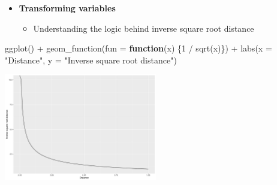 \documentclass[
  ignorenonframetext,
]{beamer}
\newenvironment{Shaded}{\begin{snugshade}}{\end{snugshade}}
\newcommand{\AttributeTok}[1]{\textcolor[rgb]{0.40,0.45,0.13}{#1}}
\newcommand{\ControlFlowTok}[1]{\textcolor[rgb]{0.00,0.23,0.31}{\textbf{#1}}}
\newcommand{\DecValTok}[1]{\textcolor[rgb]{0.68,0.00,0.00}{#1}}
\newcommand{\FunctionTok}[1]{\textcolor[rgb]{0.28,0.35,0.67}{#1}}
\newcommand{\NormalTok}[1]{\textcolor[rgb]{0.00,0.23,0.31}{#1}}
\newcommand{\SpecialCharTok}[1]{\textcolor[rgb]{0.37,0.37,0.37}{#1}}
\newcommand{\StringTok}[1]{\textcolor[rgb]{0.13,0.47,0.30}{#1}}
\providecommand{\tightlist}{%
  \setlength{\itemsep}{0pt}\setlength{\parskip}{0pt}}\usepackage{longtable,booktabs,array}
\begin{document}
\begin{frame}[fragile]{}
\label{section-23}
\begin{itemize}
\item
  \textbf{Transforming variables}

  \begin{itemize}
  \tightlist
  \item
    Understanding the logic behind inverse square root distance
  \end{itemize}
\end{itemize}

\tiny

\begin{Shaded}
\begin{Highlighting}[]
\FunctionTok{ggplot}\NormalTok{() }\SpecialCharTok{+}
  \FunctionTok{geom\_function}\NormalTok{(}\AttributeTok{fun =} \ControlFlowTok{function}\NormalTok{(x) \{}\DecValTok{1} \SpecialCharTok{/} \FunctionTok{sqrt}\NormalTok{(x)\}) }\SpecialCharTok{+}
  \FunctionTok{labs}\NormalTok{(}\AttributeTok{x =} \StringTok{"Distance"}\NormalTok{,}
       \AttributeTok{y =} \StringTok{"Inverse square root distance"}\NormalTok{)}
\end{Highlighting}
\end{Shaded}

\begin{center}
\includegraphics[width=0.5\textwidth,height=\textheight]{004_relationships_between_continuous_variables_files/figure-beamer/unnamed-chunk-23-1.pdf}
\end{center}
\end{frame}
\end{document}
